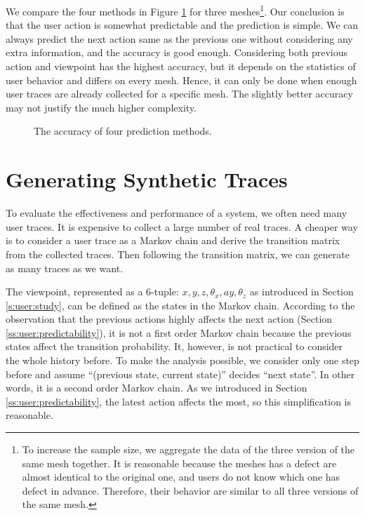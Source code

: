 We compare the four methods in Figure \ref{f:user:accuracy_comp} for three meshes\footnote{
To increase the sample size, we aggregate the data of the three version of the same mesh together.
It is reasonable because the meshes has a defect are almost identical to the original one, 
and users do not know which one has defect in advance. Therefore, their behavior are similar to
all three versions of the same mesh.}.
Our conclusion is that the user action is somewhat predictable and the prediction is simple.
We can always predict the next action same as the previous one without considering
any extra information, and the accuracy is good enough. 
Considering both previous action and viewpoint has the highest accuracy,
but it depends on the statistics of user behavior and differs on every mesh. Hence, it can only 
be done when enough user traces are already collected for a specific mesh. 
The slightly better accuracy may not justify the much higher complexity.
\begin{figure}
    \centering
    \caption{The accuracy of four prediction methods.}
    \label{f:user:accuracy_comp}
\end{figure}

\section{Generating Synthetic Traces}
To evaluate the effectiveness and performance of a system, we often need many user traces. 
It is expensive to collect a large number of real traces. 
A cheaper way is to consider a user trace as a Markov chain
and derive the transition matrix from the collected traces.
Then following the transition matrix, we can generate as many traces as we want.

The viewpoint, represented as a 6-tuple: {$x, y, z, \theta_x, ay, \theta_z$}
as introduced in Section \ref{s:user:study}, can be defined as the states in the Markov chain.
According to the observation that the previous actions highly affects the next action
(Section \ref{ss:user:predictability}),
it is not a first order Markov chain because
the previous states affect the transition probability. 
It, however, is not practical to consider the whole history before. 
To make the analysis possible, we consider only one step before and assume
``(previous state, current state)'' decides ``next state''. In other words, 
it is a second order Markov chain. 
As we introduced in Section \ref{ss:user:predictability}, the latest action affects the most, so
this simplification is reasonable.

